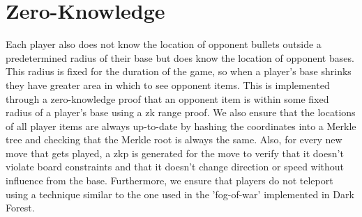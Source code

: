 \documentclass[10pt]{article}
\begin{document}
\section{Zero-Knowledge}
\par Each player also does not know the location of opponent bullets outside a predetermined radius of their base but does know the location of opponent bases. This radius is fixed for the duration of the game, so when a player's base shrinks they have greater area in which to see opponent items. This is implemented through a zero-knowledge proof that an opponent item is within some fixed radius of a player's base using a zk range proof. We also ensure that the locations of all player items are always up-to-date by hashing the coordinates into a Merkle tree and checking that the Merkle root is always the same. Also, for every new move that gets played, a zkp is generated for the move to verify that it doesn't violate board constraints and that it doesn't change direction or speed without influence from the base. Furthermore, we ensure that players do not teleport using a technique similar to the one used in the 'fog-of-war' implemented in Dark Forest.
\end{document}

